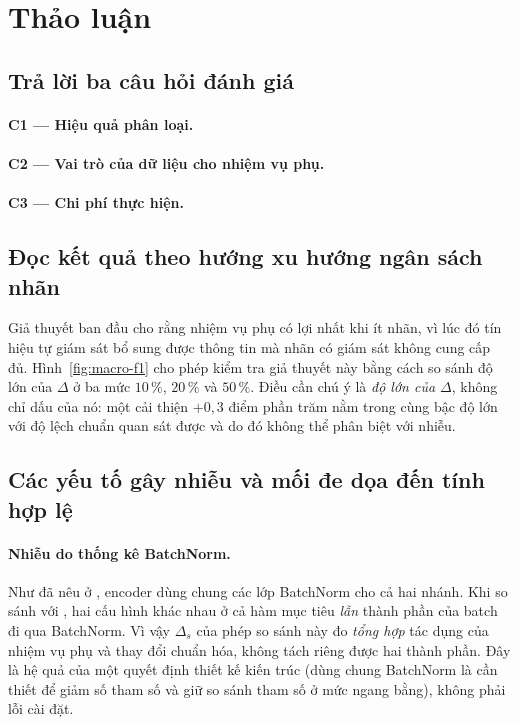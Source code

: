 \section{Thảo luận}
\label{sec:discussion}

\subsection{Trả lời ba câu hỏi đánh giá}
\label{sec:disc-answers}

\paragraph{C1 --- Hiệu quả phân loại.}
\RFindingCone

\paragraph{C2 --- Vai trò của dữ liệu cho nhiệm vụ phụ.}
\RFindingCtwo

\paragraph{C3 --- Chi phí thực hiện.}
\RFindingCthree

\subsection{Đọc kết quả theo hướng xu hướng ngân sách nhãn}
\label{sec:disc-trend}

Giả thuyết ban đầu cho rằng nhiệm vụ phụ có lợi nhất khi ít nhãn, vì lúc đó tín hiệu tự giám
sát bổ sung được thông tin mà nhãn có giám sát không cung cấp đủ. Hình~\ref{fig:macro-f1} cho
phép kiểm tra giả thuyết này bằng cách so sánh độ lớn của $\Delta$ ở ba mức $10\,\%$, $20\,\%$
và $50\,\%$. Điều cần chú ý là \emph{độ lớn của $\Delta$}, không chỉ dấu của nó: một cải thiện
$+0{,}3$ điểm phần trăm nằm trong cùng bậc độ lớn với độ lệch chuẩn quan sát được và do đó
không thể phân biệt với nhiễu.

\subsection{Các yếu tố gây nhiễu và mối đe dọa đến tính hợp lệ}
\label{sec:disc-threats}

\paragraph{Nhiễu do thống kê BatchNorm.}
\label{sec:exempt-bn}
Như đã nêu ở , encoder dùng chung các lớp BatchNorm cho cả hai nhánh. Khi so
sánh  với , hai cấu hình khác nhau ở cả hàm mục tiêu \emph{lẫn} thành phần
của batch đi qua BatchNorm. Vì vậy $\Delta_s$ của phép so sánh này đo \emph{tổng hợp} tác dụng
của nhiệm vụ phụ và thay đổi chuẩn hóa, không tách riêng được hai thành phần. Đây là hệ quả của
một quyết định thiết kế kiến trúc (dùng chung BatchNorm là cần thiết để giảm số tham số và giữ
so sánh tham số ở mức ngang bằng), không phải lỗi cài đặt.

